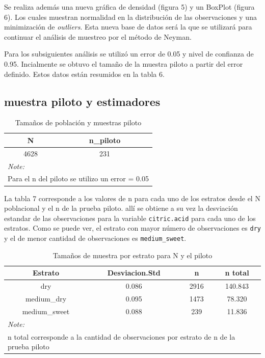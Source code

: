 \documentclass[
]{article}
\begin{document}
Se realiza además una nueva gráfica de densidad (figura 5) y un BoxPlot
(figura 6). Los cuales muestran normalidad en la distribución de las
observaciones y una minimización de \emph{outliers}. Esta nueva base de
datos será la que se utilizará para continuar el análisis de muestreo
por el método de Neyman.

Para los subsiguientes análisis se utilizó un error de 0.05 y nivel de
confianza de 0.95. Incialmente se obtuvo el tamaño de la muestra piloto
a partir del error definido. Estos datos están resumidos en la tabla 6.

\hypertarget{muestra-piloto-y-estimadores}{%
\subsection{muestra piloto y
estimadores}\label{muestra-piloto-y-estimadores}}

\begin{table}[!h]

\caption{\label{tab:tabla 2 inicial}Tamaños de población y muestras piloto}
\centering
\fontsize{8}{10}\selectfont
\begin{tabular}[t]{c|c}
\hline
N & n\_piloto\\
\hline
\rowcolor{gray!6}  4628 & 231\\
\hline
\multicolumn{2}{l}{\textit{Note: }}\\
\multicolumn{2}{l}{Para el n del piloto se utilizo un error = 0.05}\\
\end{tabular}
\end{table}

La tabla 7 corresponde a los valores de n para cada uno de los estratos
desde el N poblacional y el n de la prueba piloto. allí se obtiene a su
vez la desviación estandar de las observaciones para la variable
\texttt{citric.acid} para cada uno de los estratos. Como se puede ver,
el estrato con mayor número de observaciones es \texttt{dry} y el de
menor cantidad de observaciones es \texttt{medium\_sweet}.

\begin{table}[!h]

\caption{\label{tab:n para N y piloto}Tamaños de muestra por estrato para N y el piloto}
\centering
\fontsize{8}{10}\selectfont
\begin{tabular}[t]{c|c|c|c}
\hline
Estrato & Desviacion.Std & n & n total\\
\hline
\rowcolor{gray!6}  dry & 0.086 & 2916 & 140.843\\
\hline
medium\_dry & 0.095 & 1473 & 78.320\\
\hline
\rowcolor{gray!6}  medium\_sweet & 0.088 & 239 & 11.836\\
\hline
\multicolumn{4}{l}{\textit{Note: }}\\
\multicolumn{4}{l}{n total corresponde a la cantidad de observaciones por estrato de n de la prueba piloto}\\
\end{tabular}
\end{table}
\end{document}
